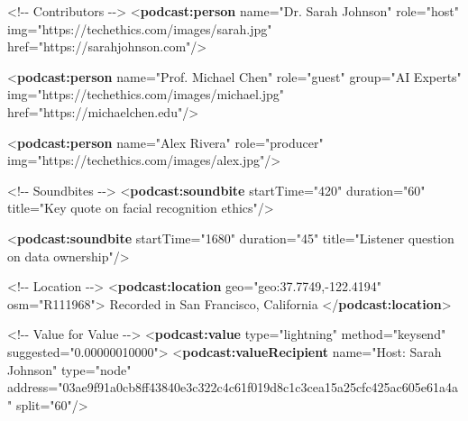 \documentclass[
  letterpaper,
  DIV=11,
  numbers=noendperiod]{scrartcl}
\newenvironment{Shaded}{\begin{snugshade}}{\end{snugshade}}
\newcommand{\CommentTok}[1]{\textcolor[rgb]{0.37,0.37,0.37}{#1}}
\newcommand{\KeywordTok}[1]{\textcolor[rgb]{0.00,0.23,0.31}{\textbf{#1}}}
\newcommand{\NormalTok}[1]{\textcolor[rgb]{0.00,0.23,0.31}{#1}}
\newcommand{\OtherTok}[1]{\textcolor[rgb]{0.00,0.23,0.31}{#1}}
\newcommand{\StringTok}[1]{\textcolor[rgb]{0.13,0.47,0.30}{#1}}
\begin{document}
\begin{Shaded}
\begin{Highlighting}[]
    \CommentTok{\textless{}!{-}{-} Contributors {-}{-}\textgreater{}}
\NormalTok{      \textless{}}\KeywordTok{podcast:person} 
\OtherTok{          name=}\StringTok{"Dr. Sarah Johnson"} 
\OtherTok{  role=}\StringTok{"host"} 
\OtherTok{       img=}\StringTok{"https://techethics.com/images/sarah.jpg"} 
\OtherTok{          href=}\StringTok{"https://sarahjohnson.com"}\NormalTok{/\textgreater{}}
    
\NormalTok{      \textless{}}\KeywordTok{podcast:person} 
\OtherTok{     name=}\StringTok{"Prof. Michael Chen"} 
\OtherTok{          role=}\StringTok{"guest"} 
\OtherTok{          group=}\StringTok{"AI Experts"}
\OtherTok{    img=}\StringTok{"https://techethics.com/images/michael.jpg"} 
\OtherTok{   href=}\StringTok{"https://michaelchen.edu"}\NormalTok{/\textgreater{}}
 
\NormalTok{      \textless{}}\KeywordTok{podcast:person} 
\OtherTok{     name=}\StringTok{"Alex Rivera"} 
\OtherTok{          role=}\StringTok{"producer"} 
\OtherTok{          img=}\StringTok{"https://techethics.com/images/alex.jpg"}\NormalTok{/\textgreater{}}
      
      \CommentTok{\textless{}!{-}{-} Soundbites {-}{-}\textgreater{}}
\NormalTok{      \textless{}}\KeywordTok{podcast:soundbite}\OtherTok{ startTime=}\StringTok{"420"}\OtherTok{ duration=}\StringTok{"60"} 
\OtherTok{          title=}\StringTok{"Key quote on facial recognition ethics"}\NormalTok{/\textgreater{}}
      
\NormalTok{      \textless{}}\KeywordTok{podcast:soundbite}\OtherTok{ startTime=}\StringTok{"1680"}\OtherTok{ duration=}\StringTok{"45"} 
\OtherTok{          title=}\StringTok{"Listener question on data ownership"}\NormalTok{/\textgreater{}}
      
   \CommentTok{\textless{}!{-}{-} Location {-}{-}\textgreater{}}
\NormalTok{      \textless{}}\KeywordTok{podcast:location} 
\OtherTok{          geo=}\StringTok{"geo:37.7749,{-}122.4194"} 
\OtherTok{          osm=}\StringTok{"R111968"}\NormalTok{\textgreater{}}
\NormalTok{  Recorded in San Francisco, California}
\NormalTok{      \textless{}/}\KeywordTok{podcast:location}\NormalTok{\textgreater{}}
   
      \CommentTok{\textless{}!{-}{-} Value for Value {-}{-}\textgreater{}}
\NormalTok{      \textless{}}\KeywordTok{podcast:value}\OtherTok{ type=}\StringTok{"lightning"}\OtherTok{ method=}\StringTok{"keysend"}\OtherTok{ suggested=}\StringTok{"0.00000010000"}\NormalTok{\textgreater{}}
\NormalTok{        \textless{}}\KeywordTok{podcast:valueRecipient} 
\OtherTok{            name=}\StringTok{"Host: Sarah Johnson"} 
\OtherTok{  type=}\StringTok{"node"} 
\OtherTok{        address=}\StringTok{"03ae9f91a0cb8ff43840e3c322c4c61f019d8c1c3cea15a25cfc425ac605e61a4a"}
\OtherTok{        split=}\StringTok{"60"}\NormalTok{/\textgreater{}}
        

\end{Highlighting}
\end{Shaded}
\end{document}
